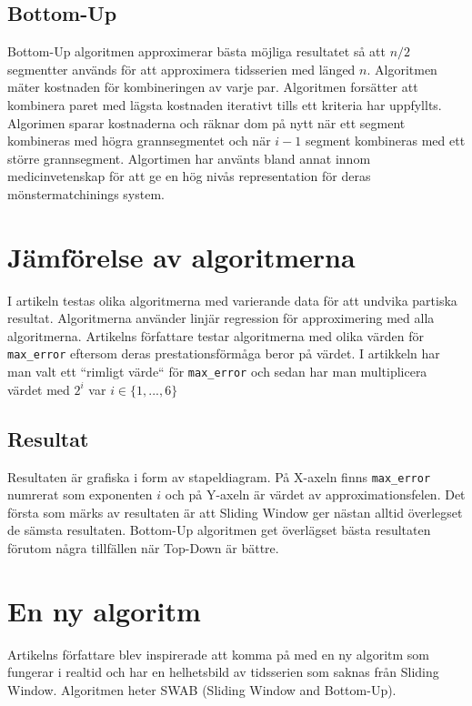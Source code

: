 \documentclass{article}
\begin{document}
\subsection{Bottom-Up}

Bottom-Up algoritmen approximerar bästa möjliga resultatet så att $n/2$ segmentter används för att approximera tidsserien med länged $n$. Algoritmen mäter kostnaden för kombineringen av varje par. Algoritmen forsätter att kombinera paret med lägsta kostnaden iterativt tills ett kriteria har uppfyllts. Algorimen sparar kostnaderna och räknar dom på nytt när ett segment kombineras med högra grannsegmentet och när $i-1$ segment kombineras med ett större grannsegment. Algortimen har använts bland annat innom medicinvetenskap för att ge en hög nivås representation för deras mönstermatchinings system.

\section{Jämförelse av algoritmerna}

I artikeln testas olika algoritmerna med varierande data för att undvika partiska resultat. Algoritmerna använder linjär regression för approximering med alla algoritmerna. Artikelns författare testar algoritmerna med olika värden för \texttt{max_error} eftersom deras prestationsförmåga beror på värdet. I artikkeln har man valt ett ``rimligt värde`` för \texttt{max_error} och sedan har man multiplicera värdet med $2^i$ var $i \in \{ 1, ..., 6 \}$

\subsection{Resultat}

Resultaten är grafiska i form av stapeldiagram. På X-axeln finns \texttt{max_error} numrerat som exponenten $i$ och på Y-axeln är värdet av approximationsfelen. Det första som märks av resultaten är att Sliding Window ger nästan alltid överlegset de sämsta resultaten. Bottom-Up algoritmen get överlägset bästa resultaten förutom några tillfällen när Top-Down är bättre.

\section{En ny algoritm}

Artikelns författare blev inspirerade att komma på med en ny algoritm som fungerar i realtid och har en helhetsbild av tidsserien som saknas från Sliding Window. Algoritmen heter SWAB (Sliding Window and Bottom-Up).
\end{document}
